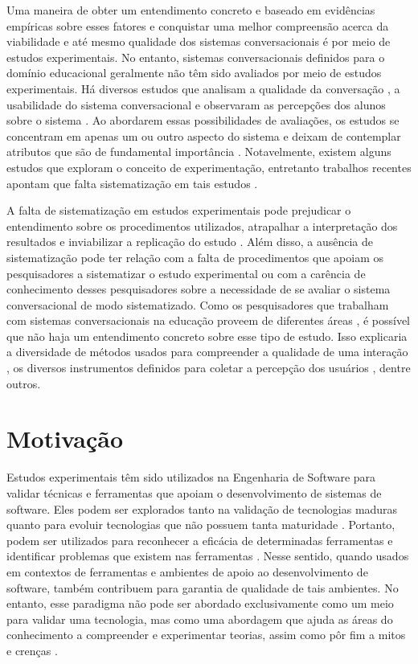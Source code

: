 Uma maneira de obter um entendimento concreto e baseado em evidências empíricas sobre esses fatores e conquistar uma melhor compreensão acerca da viabilidade e até mesmo qualidade dos sistemas conversacionais é por meio de estudos experimentais. No entanto, sistemas conversacionais definidos para o domínio educacional geralmente não têm sido avaliados por meio de estudos experimentais. Há diversos estudos que analisam a qualidade da conversação \cite{Paschoal:2019}, a usabilidade do sistema conversacional \cite{kim2020} e observaram as percepções dos alunos sobre o sistema \cite{krassmann2018}. Ao abordarem essas possibilidades de avaliações, os estudos se concentram em apenas um ou outro aspecto do sistema e deixam de contemplar atributos que são de fundamental importância \cite{paschoalframework}. Notavelmente, existem alguns estudos que exploram o conceito de experimentação, entretanto trabalhos recentes apontam que falta sistematização em tais estudos \cite{hobert2019, winkler2018}. 

A falta de sistematização em estudos experimentais pode prejudicar o entendimento sobre os procedimentos utilizados, atrapalhar a interpretação dos resultados e inviabilizar a replicação do estudo \cite{Wohlin, 493439}. Além disso, a ausência de sistematização pode ter relação com a falta de procedimentos que apoiam os pesquisadores a sistematizar o estudo experimental ou com a carência de conhecimento desses pesquisadores sobre a necessidade de se avaliar o sistema conversacional de modo sistematizado. Como os pesquisadores que trabalham com sistemas conversacionais na educação proveem de diferentes áreas \cite{hobert2019, winkler2018}, é possível que não haja um entendimento concreto sobre esse tipo de estudo. Isso explicaria a diversidade de métodos usados para compreender a qualidade de uma interação \cite{abushawar2016}, os diversos instrumentos definidos para coletar a percepção dos usuários \cite{norouzi2018}, dentre outros.

\section{Motivação}

Estudos experimentais têm sido utilizados na Engenharia de Software para validar técnicas e ferramentas que apoiam o desenvolvimento de sistemas de software. Eles podem ser explorados tanto na validação de tecnologias maduras quanto para evoluir tecnologias que não possuem tanta maturidade \cite{Shull}. Portanto, podem ser utilizados para reconhecer a eficácia de determinadas ferramentas e identificar problemas que existem nas ferramentas \cite{Vos:2012}. Nesse sentido, quando usados em contextos de ferramentas e ambientes de apoio ao desenvolvimento de software, também contribuem para garantia de qualidade de tais ambientes. No entanto, esse paradigma não pode ser abordado exclusivamente como um meio para validar uma tecnologia, mas como uma abordagem que ajuda as áreas do conhecimento a compreender e experimentar teorias, assim como pôr fim a mitos e crenças \cite{Devanbu}. 

